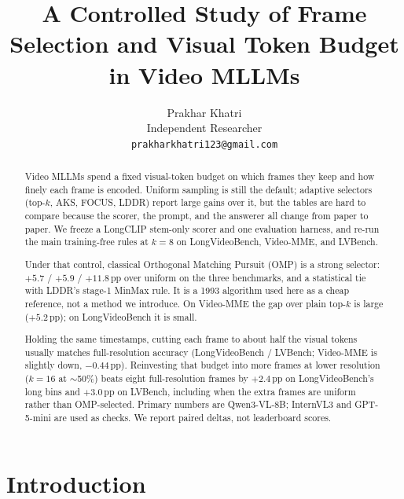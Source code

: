 \documentclass[11pt]{article}
\title{A Controlled Study of Frame Selection and Visual Token Budget\\in Video MLLMs}
\author{Prakhar Khatri \\ Independent Researcher \\ \texttt{prakharkhatri123@gmail.com}}
\begin{document}
\maketitle

\begin{abstract}
Video MLLMs spend a fixed visual-token budget on which frames they keep and how finely each frame is encoded.
Uniform sampling is still the default; adaptive selectors (top-$k$, AKS, FOCUS, LDDR) report large gains over it, but the tables are hard to compare because the scorer, the prompt, and the answerer all change from paper to paper.
We freeze a LongCLIP stem-only scorer and one evaluation harness, and re-run the main training-free rules at $k{=}8$ on LongVideoBench, Video-MME, and LVBench.

Under that control, classical Orthogonal Matching Pursuit (OMP) is a strong selector: ${+}5.7$ / ${+}5.9$ / ${+}11.8$\,pp over uniform on the three benchmarks, and a statistical tie with LDDR's stage-1 MinMax rule.
It is a 1993 algorithm used here as a cheap reference, not a method we introduce.
On Video-MME the gap over plain top-$k$ is large (${+}5.2$\,pp); on LongVideoBench it is small.

Holding the same timestamps, cutting each frame to about half the visual tokens usually matches full-resolution accuracy (LongVideoBench / LVBench; Video-MME is slightly down, ${-}0.44$\,pp).
Reinvesting that budget into more frames at lower resolution ($k{=}16$ at $\sim$50\%) beats eight full-resolution frames by ${+}2.4$\,pp on LongVideoBench's long bins and ${+}3.0$\,pp on LVBench, including when the extra frames are uniform rather than OMP-selected.
Primary numbers are Qwen3-VL-8B; InternVL3 and GPT-5-mini are used as checks.
We report paired deltas, not leaderboard scores.
\end{abstract}

\section{Introduction}
\end{document}
